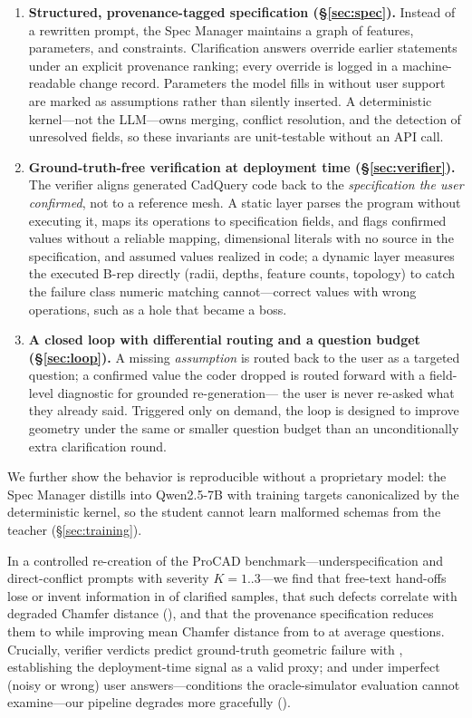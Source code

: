 \begin{enumerate}
  \item \textbf{Structured, provenance-tagged specification
  (\S\ref{sec:spec}).} Instead of a rewritten prompt, the Spec Manager
  maintains a graph of features, parameters, and constraints. Clarification answers
  override earlier statements under an explicit provenance ranking; every
  override is logged in a machine-readable change record. Parameters the
  model fills in without user support are marked as assumptions rather than
  silently inserted. A deterministic kernel---not the LLM---owns merging,
  conflict resolution, and the detection of unresolved fields, so these
  invariants are unit-testable without an API call.

  \item \textbf{Ground-truth-free verification at deployment time
  (\S\ref{sec:verifier}).} The verifier aligns generated CadQuery code back
  to the \emph{specification the user confirmed}, not to a reference mesh. A
  static layer parses the program without executing it, maps its operations
  to specification fields, and flags confirmed values without a reliable
  mapping, dimensional literals with no source in the specification, and
  assumed values realized in code; a dynamic layer
  measures the executed B-rep directly (radii, depths, feature counts,
  topology) to catch the failure class numeric matching cannot---correct
  values with wrong operations, such as a hole that became a boss.

  \item \textbf{A closed loop with differential routing and a question
  budget (\S\ref{sec:loop}).} A missing \emph{assumption} is routed back to
  the user as a targeted question; a confirmed value the coder dropped is
  routed forward with a field-level diagnostic for grounded re-generation---
  the user is never re-asked what they already said. Triggered only on
  demand, the loop is designed to improve geometry under the same or smaller
  question budget than an unconditionally extra clarification round.
\end{enumerate}

We further show the behavior is reproducible without a proprietary model: the
Spec Manager distills into Qwen2.5-7B with training targets canonicalized by
the deterministic kernel, so the student cannot learn malformed schemas from
the teacher (\S\ref{sec:training}).

In a controlled re-creation of the ProCAD benchmark---underspecification and
direct-conflict prompts with severity $K{=}1..3$---we find that free-text
hand-offs lose or invent information in  of clarified
samples, that such defects correlate with degraded Chamfer distance
(), and that the provenance specification reduces them to
 while improving mean Chamfer distance from
 to  at  average questions.
Crucially, verifier verdicts predict ground-truth geometric failure with
, establishing the deployment-time signal as a valid
proxy; and under imperfect (noisy or wrong) user answers---conditions the
oracle-simulator evaluation cannot examine---our pipeline degrades more
gracefully ().

